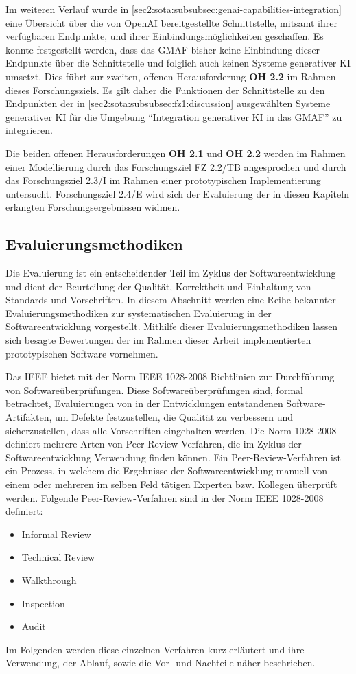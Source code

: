 Im weiteren Verlauf wurde in \cref{sec2:sota:subsubsec:genai-capabilities-integration} eine Übersicht über die von OpenAI bereitgestellte Schnittstelle, mitsamt ihrer verfügbaren Endpunkte, und ihrer Einbindungsmöglichkeiten geschaffen.
Es konnte festgestellt werden, dass das GMAF bisher keine Einbindung dieser Endpunkte über die Schnittstelle und folglich auch keinen Systeme generativer KI umsetzt.
Dies führt zur zweiten, offenen Herausforderung \textbf{OH 2.2} im Rahmen dieses Forschungsziels.
Es gilt daher die Funktionen der Schnittstelle zu den Endpunkten der in \cref{sec2:sota:subsubsec:fz1:discussion} ausgewählten Systeme generativer KI für die Umgebung \enquote{Integration generativer KI in das GMAF} zu integrieren.

Die beiden offenen Herausforderungen \textbf{OH 2.1} und \textbf{OH 2.2} werden im Rahmen einer Modellierung durch das Forschungsziel FZ 2.2/TB angesprochen und durch das Forschungsziel 2.3/I im Rahmen einer prototypischen Implementierung untersucht.
Forschungsziel 2.4/E wird sich der Evaluierung der in diesen Kapiteln erlangten Forschungsergebnissen widmen.

\clearpage

\subsection{Evaluierungsmethodiken}
\label{sec2:sota:subsec:eval-methodology}
Die Evaluierung ist ein entscheidender Teil im Zyklus der Softwareentwicklung und dient der Beurteilung der Qualität, Korrektheit und Einhaltung von Standards und Vorschriften.
In diesem Abschnitt werden eine Reihe bekannter Evaluierungsmethodiken zur systematischen Evaluierung in der Softwareentwicklung vorgestellt.
Mithilfe dieser Evaluierungsmethodiken lassen sich besagte Bewertungen der im Rahmen dieser Arbeit implementierten prototypischen Software vornehmen.

Das IEEE \cite{ieee} bietet mit der Norm IEEE 1028-2008 \cite{ieee-1028-2008} Richtlinien zur Durchführung von Softwareüberprüfungen.
Diese Softwareüberprüfungen sind, formal betrachtet, Evaluierungen von in der Entwicklungen entstandenen Software-Artifakten, um Defekte festzustellen, die Qualität zu verbessern und sicherzustellen, dass alle Vorschriften eingehalten werden.
Die Norm 1028-2008 definiert mehrere Arten von Peer-Review-Verfahren, die im Zyklus der Softwareentwicklung Verwendung finden können.
Ein Peer-Review-Verfahren ist ein Prozess, in welchem die Ergebnisse der Softwareentwicklung manuell von einem oder mehreren im selben Feld tätigen Experten bzw. Kollegen überprüft werden.
Folgende Peer-Review-Verfahren sind in der Norm IEEE 1028-2008 definiert:
\begin{itemize}
    \item Informal Review
    \item Technical Review
    \item Walkthrough
    \item Inspection
    \item Audit
\end{itemize}
Im Folgenden werden diese einzelnen Verfahren kurz erläutert und ihre Verwendung, der Ablauf, sowie die Vor- und Nachteile näher beschrieben.

